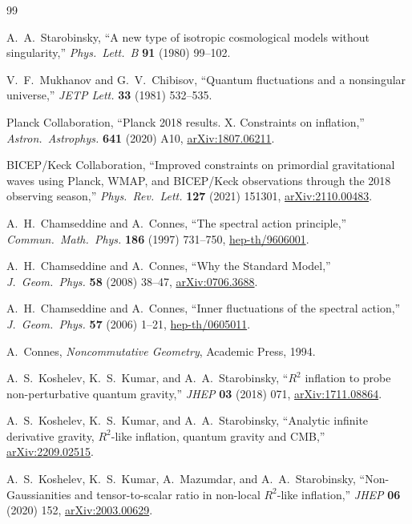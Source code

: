 \documentclass[11pt,a4paper]{article}
\theoremstyle{plain}
\theoremstyle{definition}
\begin{document}
\begin{thebibliography}{99}

A.~A.~Starobinsky,
``A new type of isotropic cosmological models without singularity,''
\emph{Phys.\ Lett.\ B} \textbf{91} (1980) 99--102.

V.~F.~Mukhanov and G.~V.~Chibisov,
``Quantum fluctuations and a nonsingular universe,''
\emph{JETP Lett.} \textbf{33} (1981) 532--535.

Planck Collaboration,
``Planck 2018 results. X. Constraints on inflation,''
\emph{Astron.\ Astrophys.} \textbf{641} (2020) A10,
\href{https://arxiv.org/abs/1807.06211}{arXiv:1807.06211}.

BICEP/Keck Collaboration,
``Improved constraints on primordial gravitational waves using Planck,
WMAP, and BICEP/Keck observations through the 2018 observing season,''
\emph{Phys.\ Rev.\ Lett.} \textbf{127} (2021) 151301,
\href{https://arxiv.org/abs/2110.00483}{arXiv:2110.00483}.

A.~H.~Chamseddine and A.~Connes,
``The spectral action principle,''
\emph{Commun.\ Math.\ Phys.} \textbf{186} (1997) 731--750,
\href{https://arxiv.org/abs/hep-th/9606001}{hep-th/9606001}.

A.~H.~Chamseddine and A.~Connes,
``Why the Standard Model,''
\emph{J.\ Geom.\ Phys.} \textbf{58} (2008) 38--47,
\href{https://arxiv.org/abs/0706.3688}{arXiv:0706.3688}.

A.~H.~Chamseddine and A.~Connes,
``Inner fluctuations of the spectral action,''
\emph{J.\ Geom.\ Phys.} \textbf{57} (2006) 1--21,
\href{https://arxiv.org/abs/hep-th/0605011}{hep-th/0605011}.

A.~Connes,
\emph{Noncommutative Geometry},
Academic Press, 1994.

A.~S.~Koshelev, K.~S.~Kumar, and A.~A.~Starobinsky,
``$R^2$ inflation to probe non-perturbative quantum gravity,''
\emph{JHEP} \textbf{03} (2018) 071,
\href{https://arxiv.org/abs/1711.08864}{arXiv:1711.08864}.

A.~S.~Koshelev, K.~S.~Kumar, and A.~A.~Starobinsky,
``Analytic infinite derivative gravity, $R^2$-like inflation,
quantum gravity and CMB,''
\href{https://arxiv.org/abs/2209.02515}{arXiv:2209.02515}.

A.~S.~Koshelev, K.~S.~Kumar, A.~Mazumdar, and A.~A.~Starobinsky,
``Non-Gaussianities and tensor-to-scalar ratio in non-local
$R^2$-like inflation,''
\emph{JHEP} \textbf{06} (2020) 152,
\href{https://arxiv.org/abs/2003.00629}{arXiv:2003.00629}.


\end{thebibliography}
\end{document}
